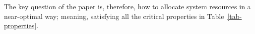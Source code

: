 
The key question of the paper is, therefore, how to allocate system resources in a near-optimal way; meaning, satisfying all the critical properties in Table~\ref{tab-properties}.

%
%
%
%
%
%
%




